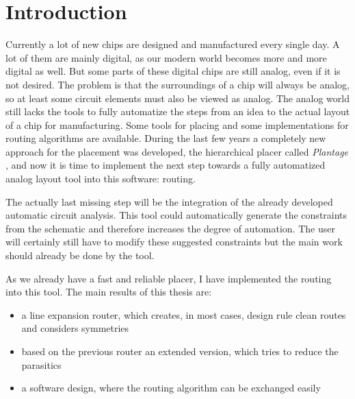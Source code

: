 \chapter{Introduction}

Currently a lot of new chips are designed and manufactured every single day. A lot of them are mainly digital, as our modern world becomes more and more digital as well. But some parts of these digital chips are still analog, even if it is not desired. The problem is that the surroundings of a chip will always be analog, so at least some circuit elements must also be viewed as analog. The analog world still lacks the tools to fully automatize the steps from an idea to the actual layout of a chip for manufacturing. Some tools for placing and some implementations for routing algorithms are available. During the last few years a completely new approach for the placement was developed, the hierarchical placer called \textit{Plantage} \cite{iccad:plantage}, and now it is time to implement the next step towards a fully automatized analog layout tool into this software: routing.

The actually last missing step will be the integration of the already developed automatic circuit analysis. This tool could automatically generate the constraints from the schematic and therefore increases the degree of automation. The user will certainly still have to modify these suggested constraints but the main work should already be done by the tool.

As we already have a fast and reliable placer, I have implemented the routing into this tool. The main results of this thesis are:
\begin{itemize}
\item a line expansion router, which creates, in most cases, design rule clean routes and considers symmetries
\item based on the previous router an extended version, which tries to reduce the parasitics
\item a software design, where the routing algorithm can be exchanged easily
\end{itemize}